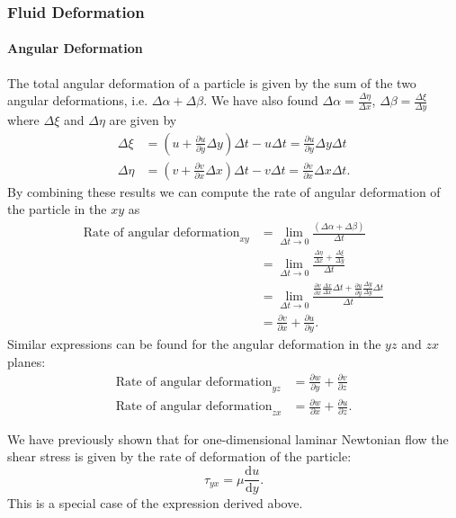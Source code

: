 \subsubsection{Fluid Deformation}

\paragraph{Angular Deformation}
The total angular deformation of a particle is given by the sum of the two angular deformations, i.e. $\Delta \alpha + \Delta \beta$. We have also found $\Delta \alpha = \frac{\Delta \eta}{\Delta x}$, $\Delta \beta = \frac{\Delta \xi}{\Delta y}$ where $\Delta \xi$  and $\Delta \eta$ are given by
\begin{align*}
  \Delta \xi &= \left( u + \frac{\partial u}{\partial y} \Delta y \right)\Delta t - u \Delta t = \frac{\partial u}{\partial y} \Delta y\Delta t \\
  \Delta \eta &= \left( v + \frac{\partial v}{\partial x} \Delta x \right) \Delta t - v \Delta t = \frac{\partial v}{\partial x} \Delta x \Delta t
.\end{align*}
By combining these results we can compute the rate of angular deformation of the particle in the $xy$ as
\begin{align*}
  \text{Rate of angular deformation}_{xy} &= \lim_{\Delta t \to 0} \frac{\left( \Delta \alpha + \Delta \beta \right)}{\Delta t} \\
  &= \lim_{\Delta t \to 0} \frac{\frac{\Delta \eta}{\Delta x} + \frac{\Delta \xi}{\Delta y}}{\Delta t} \\
  &= \lim_{\Delta t \to 0} \frac{\frac{\partial v}{\partial x} \frac{\Delta x}{\Delta x} \Delta t + \frac{\partial u}{\partial y} \frac{\Delta y}{\Delta y} \Delta t}{\Delta t} \\
  &= \frac{\partial v}{\partial x} + \frac{\partial u}{\partial y}
.\end{align*}
Similar expressions can be found for the angular deformation in the $yz$ and $zx$ planes:
\begin{align*}
  \text{Rate of angular deformation}_{yz} &= \frac{\partial w}{\partial y} + \frac{\partial v}{\partial z} \\
  \text{Rate of angular deformation}_{zx} &= \frac{\partial w}{\partial x} + \frac{\partial u}{\partial z} 
.\end{align*}

We have previously shown that for one-dimensional laminar Newtonian flow the shear stress is given by the rate of deformation of the particle:
\[ 
\tau_{yx} = \mu \frac{\mathrm{d}u}{\mathrm{d}y} 
.\]
This is a special case of the expression derived above. 


